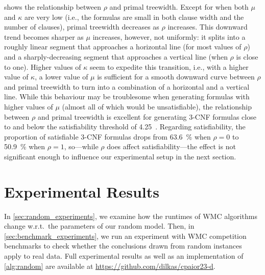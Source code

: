 \documentclass[runningheads]{llncs}
\begin{document}
 shows the relationship between $\rho$ and
primal treewidth. Except for when both $\mu$ and $\kappa$ are very low (i.e.,
the formulas are small in both clause width and the number of clauses), primal
treewidth decreases as $\rho$ increases. This downward trend becomes sharper as
$\mu$ increases, however, not uniformly: it splits into a roughly linear segment
that approaches a horizontal line (for most values of $\rho$) and a
sharply-decreasing segment that approaches a vertical line (when $\rho$ is close
to one). Higher values of $\kappa$ seem to expedite this transition, i.e., with
a higher value of $\kappa$, a lower value of $\mu$ is sufficient for a smooth
downward curve between $\rho$ and primal treewidth to turn into a combination of
a horizontal and a vertical line. While this behaviour may be troublesome when
generating formulas with higher values of $\mu$ (almost all of which would be
unsatisfiable), the relationship between $\rho$ and primal treewidth is
excellent for generating 3-CNF formulas close to and below the satisfiability
threshold of 4.25~\cite{DBLP:journals/ai/CrawfordA96}. Regarding satisfiability,
the proportion of satisfiable 3-CNF formulas drops from \SI{63.6}{\percent} when
$\rho = 0$ to \SI{50.9}{\percent} when $\rho = 1$, so---while $\rho$ does affect
satisfiability---the effect is not significant enough to influence our
experimental setup in the next section.


\section{Experimental Results}\label{sec:experiments}

In \cref{sec:random_experiments}, we examine how the runtimes of \textsf{WMC}
algorithms change w.r.t.\ the parameters of our random model. Then, in
\cref{sec:benchmark_experiments}, we run an experiment with \textsf{WMC}
competition benchmarks to check whether the conclusions drawn from random
instances apply to real data. Full experimental results as well as an
implementation of \cref{alg:random} are available at
\url{https://github.com/dilkas/cpaior23-d}.
\end{document}

